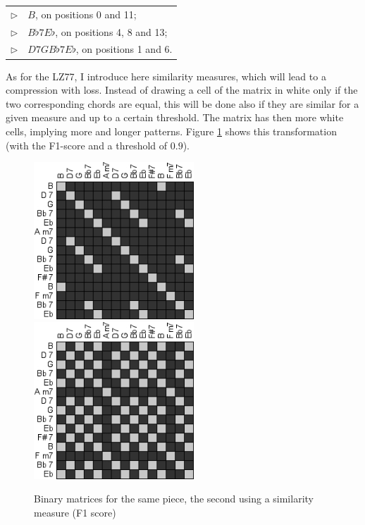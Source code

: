 \documentclass[a4paper,10pt]{article}
\begin{document}
\begin{tabular}{rl}
$\triangleright$ & $B$, on positions 0 and 11; \\
$\triangleright$ & $B\flat 7E\flat$, on positions 4, 8 and 13; \\
$\triangleright$ & $D7GB\flat 7E\flat$, on positions 1 and 6.\\
\end{tabular}


As for the LZ77, I introduce here similarity measures, which will lead to a compression with loss. Instead of drawing a cell of the matrix in white only if the two corresponding chords are equal, this will be done also if they are similar for a given measure and up to a certain threshold. The matrix has then more white cells, implying more and longer patterns. Figure \ref{loose} shows this transformation (with the F1-score and a threshold of $0.9$).

\begin{figure}
\centering
\includegraphics[width=6cm]{images/diagonals1.jpg}\hspace{1cm}
\includegraphics[width=6cm]{images/diagonals3.jpg}
\caption{Binary matrices for the same piece, the second using a similarity measure (F1 score)\label{loose}}
\end{figure}
\end{document}
